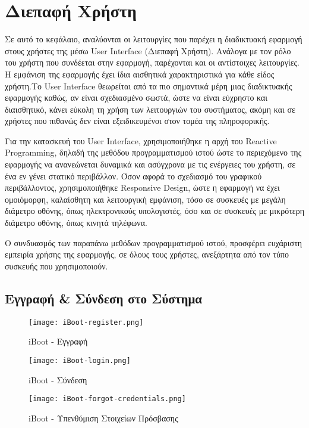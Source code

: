 \chapter{Διεπαφή Χρήστη}
Σε αυτό το κεφάλαιο, αναλύονται οι λειτουργίες που παρέχει η διαδικτυακή εφαρμογή στους χρήστες της μέσω User Interface (Διεπαφή Χρήστη). Ανάλογα με τον ρόλο του χρήστη που συνδέεται στην εφαρμογή, παρέχονται και οι αντίστοιχες λειτουργίες. Η εμφάνιση της εφαρμογής έχει ίδια αισθητικά χαρακτηριστικά για κάθε είδος χρήστη.Το User Interface θεωρείται από τα πιο σημαντικά μέρη μιας διαδικτυακής εφαρμογής καθώς, αν είναι σχεδιασμένο σωστά, ώστε να είναι εύχρηστο και διαισθητικό, κάνει εύκολη τη χρήση των λειτουργιών του συστήματος, ακόμη και σε χρήστες που πιθανώς δεν είναι εξειδικευμένοι στον τομέα της πληροφορικής.

Για την κατασκευή του User Interface, χρησιμοποιήθηκε η αρχή του Reactive Programming, δηλαδή της μεθόδου προγραμματισμού ιστού ώστε το περιεχόμενο της εφαρμογής να ανανεώνεται δυναμικά και ασύγχρονα με τις ενέργειες του χρήστη, σε ένα εν γένει στατικό περιβάλλον. Όσον αφορά το σχεδιασμό του γραφικού περιβάλλοντος, χρησιμοποιήθηκε Responsive Design, ώστε η εφαρμογή να έχει ομοιόμορφη, καλαίσθητη και λειτουργική εμφάνιση, τόσο σε συσκευές με μεγάλη διάμετρο οθόνης, όπως ηλεκτρονικούς υπολογιστές, όσο και σε συσκευές με μικρότερη διάμετρο οθόνης, όπως κινητά τηλέφωνα.

Ο συνδυασμός των παραπάνω μεθόδων προγραμματισμού ιστού, προσφέρει ευχάριστη εμπειρία χρήσης της εφαρμογής, σε όλους τους χρήστες, ανεξάρτητα από τον τύπο συσκευής που χρησιμοποιούν.

\section{Εγγραφή \& Σύνδεση στο Σύστημα}

\FloatBarrier

\begin{figure}[ht]
	\centering
	\texttt{[image: iBoot-register.png]}
	\caption{iBoot - Εγγραφή}
	\label{fig:iBoot_register}
\end{figure}

\begin{figure}[ht]
	\centering
	\texttt{[image: iBoot-login.png]}
	\caption{iBoot - Σύνδεση}
	\label{fig:iBoot_login}
\end{figure}

\begin{figure}[ht]
	\centering
	\texttt{[image: iBoot-forgot-credentials.png]}
	\caption{iBoot - Υπενθύμιση Στοιχείων Πρόσβασης}
	\label{fig:iBoot_forgot_credentials}
\end{figure}

